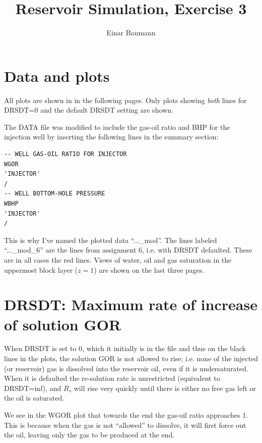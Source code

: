 



\title{Reservoir Simulation, Exercise 3}
\author{Einar Baumann}
\maketitle
\thispagestyle{empty}

\section{Data and plots} %
\label{sec:data_and_plots}

All plots are shown in in the following pages. Only plots showing \emph{both} lines for DRSDT=0 and the default DRSDT setting are shown.

The DATA file was modified to include the gas-oil ratio and BHP for the injection well by inserting the following lines in the summary section:
\begin{verbatim}
-- WELL GAS-OIL RATIO FOR INJECTOR
WGOR
'INJECTOR'
/
-- WELL BOTTOM-HOLE PRESSURE
WBHP
'INJECTOR'
/
\end{verbatim}

\noindent This is why I've named the plotted data ``...\_mod''. The lines labeled ``...\_mod\_6'' are the lines from assignment 6, i.e. with DRSDT defaulted. These are in all cases the red lines. Views of water, oil and gas saturation in the uppermost block layer ($z=1$) are shown on the last three pages.

\section{DRSDT: Maximum rate of increase of solution GOR} %
\label{sec:drsdt_maximum_rate_of_increase_of_solution_gor}

When DRSDT is set to 0, which it initially is in the file and thus on the black lines in the plots, the solution GOR is not allowed to rise; i.e. none of the injected (or reservoir) gas is dissolved into the reservoir oil, even if it is undersaturated. When it is defaulted the re-solution rate is unrestricted (equivalent to DRSDT=inf), and $R_s$ will rise very quickly until there is either no free gas left or the oil is saturated.

We see in the WGOR plot that towards the end the gas-oil ratio approaches 1. This is because when the gas is not ``allowed'' to dissolve, it will first force out the oil, leaving only the gas to be produced at the end.

